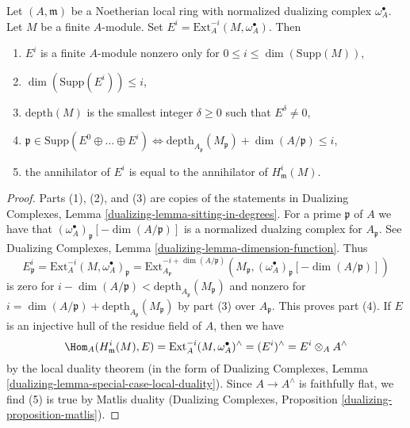 \begin{lemma}
\label{lemma-sitting-in-degrees}
Let $(A, \mathfrak m)$ be a Noetherian local ring with
normalized dualizing complex $\omega_A^\bullet$.
Let $M$ be a finite $A$-module.
Set $E^i = \text{Ext}_A^{-i}(M, \omega_A^\bullet)$.
Then
\begin{enumerate}
\item $E^i$ is a finite $A$-module nonzero only for
$0 \leq i \leq \dim(\text{Supp}(M))$,
\item $\dim(\text{Supp}(E^i)) \leq i$,
\item $\text{depth}(M)$ is the smallest integer $\delta \geq 0$ such that
$E^\delta \not = 0$,
\item $\mathfrak p \in \text{Supp}(E^0 \oplus \ldots \oplus E^i)
\Leftrightarrow
\text{depth}_{A_\mathfrak p}(M_\mathfrak p) + \dim(A/\mathfrak p) \leq i$,
\item the annihilator of $E^i$ is equal to the annihilator
of $H^i_\mathfrak m(M)$.
\end{enumerate}
\end{lemma}

\begin{proof}
Parts (1), (2), and (3) are copies of the statements in
Dualizing Complexes, Lemma \ref{dualizing-lemma-sitting-in-degrees}.
For a prime $\mathfrak p$ of $A$ we have that
$(\omega_A^\bullet)_\mathfrak p[-\dim(A/\mathfrak p)]$
is a normalized dualzing complex for $A_\mathfrak p$.
See Dualizing Complexes, Lemma \ref{dualizing-lemma-dimension-function}.
Thus
$$
E^i_\mathfrak p =
\text{Ext}^{-i}_A(M, \omega_A^\bullet)_\mathfrak p =
\text{Ext}^{-i + \dim(A/\mathfrak p)}_{A_\mathfrak p}
(M_\mathfrak p, (\omega_A^\bullet)_\mathfrak p[-\dim(A/\mathfrak p)])
$$
is zero for
$i - \dim(A/\mathfrak p) < \text{depth}_{A_\mathfrak p}(M_\mathfrak p)$
and nonzero for
$i = \dim(A/\mathfrak p) + \text{depth}_{A_\mathfrak p}(M_\mathfrak p)$
by part (3) over $A_\mathfrak p$.
This proves part (4).
If $E$ is an injective hull of the residue field of $A$, then we have
$$
\Hom_A(H^i_\mathfrak m(M), E) =
\text{Ext}^{-i}_A(M, \omega_A^\bullet)^\wedge =
(E^i)^\wedge =
E^i \otimes_A A^\wedge
$$
by the local duality theorem (in the form of
Dualizing Complexes, Lemma \ref{dualizing-lemma-special-case-local-duality}).
Since $A \to A^\wedge$ is faithfully flat, we find (5) is true by
Matlis duality
(Dualizing Complexes, Proposition \ref{dualizing-proposition-matlis}).
\end{proof}






